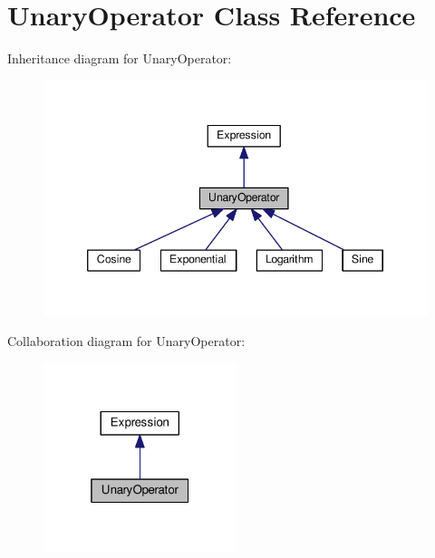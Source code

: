 \hypertarget{classUnaryOperator}{}\section{Unary\+Operator Class Reference}
\label{classUnaryOperator}


Inheritance diagram for Unary\+Operator\+:\nopagebreak
\begin{figure}[H]
\begin{center}
\leavevmode
\includegraphics[width=346pt]{classUnaryOperator__inherit__graph}
\end{center}
\end{figure}


Collaboration diagram for Unary\+Operator\+:\nopagebreak
\begin{figure}[H]
\begin{center}
\leavevmode
\includegraphics[width=160pt]{classUnaryOperator__coll__graph}
\end{center}
\end{figure}

